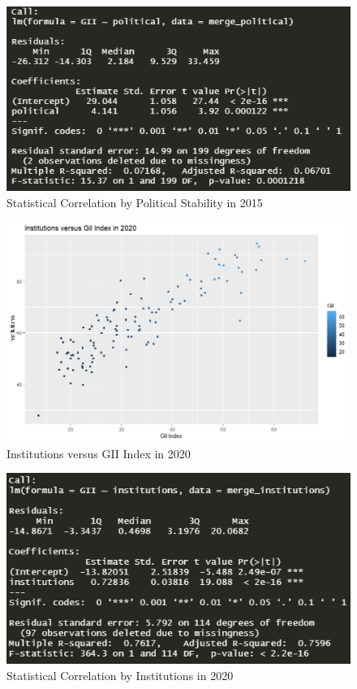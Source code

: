 \documentclass[15pt]{article}
\begin{document}
\begin{figure}[H]
    \centering
    \includegraphics[scale = 0.7]{Part5_Political_r^2.png}
    \caption{Statistical Correlation by Political Stability in 2015}
\end{figure}

\begin{figure}[H]
    \centering
    \includegraphics[scale = 0.7]{Part5_Institutions.png}
    \caption{Institutions versus GII Index in 2020}
\end{figure}

\begin{figure}[H]
    \centering
    \includegraphics[scale = 0.7]{Part5_Institutions_r^2.PNG}
    \caption{Statistical Correlation by Institutions in 2020}
\end{figure}
\end{document}
